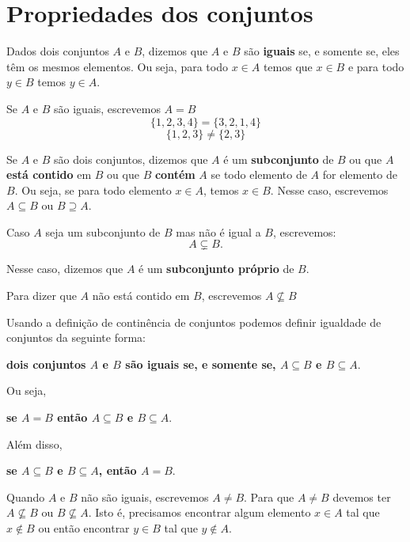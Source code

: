 \section{Propriedades dos conjuntos}

\begin{definicao}
	Dados dois conjuntos $A$ e $B$, dizemos que $A$ e $B$ s{\~a}o \textbf{iguais} se, e somente se, eles t{\^e}m os mesmos elementos. Ou seja, para todo $x \in A$ temos que $x \in B$ e para todo $y \in B$ temos $y \in A$.
\end{definicao}

Se $A$ e $B$ s{\~a}o iguais, escrevemos $A = B$
\[ \{1,2,3,4\} = \{3,2,1,4\} \]
\[ \{1,2,3\} \neq \{2,3\} \]

\begin{definicao}
	Se $A$ e $B$ s{\~a}o dois conjuntos, dizemos que $A$ {\'e} um \textbf{subconjunto} de $B$ ou que $A$ \textbf{est\'a contido} em $B$ ou que $B$ \textbf{cont\'em} $A$ se todo elemento de $A$ for elemento de $B$. Ou seja, se para todo elemento $x \in A$, temos $x \in B$. Nesse caso, escrevemos $A \subseteq B$ ou $B \supseteq A$.
\end{definicao}


Caso $A$ seja um subconjunto de $B$ mas n{\~a}o {\'e} igual a $B$, escrevemos:
\[
A \subsetneq B.
\]

Nesse caso, dizemos que $A$ {\'e} um \textbf{subconjunto pr{\'o}prio} de $B$.

Para dizer que $A$ n{\~a}o est{\'a} contido em $B$, escrevemos $A \nsubseteq B$

Usando a defini\c{c}\~ao de contin\^encia de conjuntos podemos definir igualdade de conjuntos da seguinte forma:
\begin{center}
	\textbf{dois conjuntos $A$ e $B$ s\~ao iguais se, e somente se, $A \subseteq B$ e $B \subseteq A$}.
\end{center}

Ou seja,
\begin{center}
	\textbf{se $A = B$ ent{\~a}o $A \subseteq B$ e $B \subseteq A$}.
\end{center}

Além disso,
\begin{center}
	\textbf{se $A \subseteq B$ e $B \subseteq A$, ent{\~a}o $A = B$}.
\end{center}

Quando $A$ e $B$ n{\~a}o s{\~a}o iguais, escrevemos $A \neq B$. Para que $A \neq B$ devemos ter $A \nsubseteq B$ ou $B \nsubseteq A$. Isto é, precisamos encontrar algum elemento $x \in A$ tal que $x \notin B$ ou então encontrar $y \in B$ tal que $y \notin A$.

